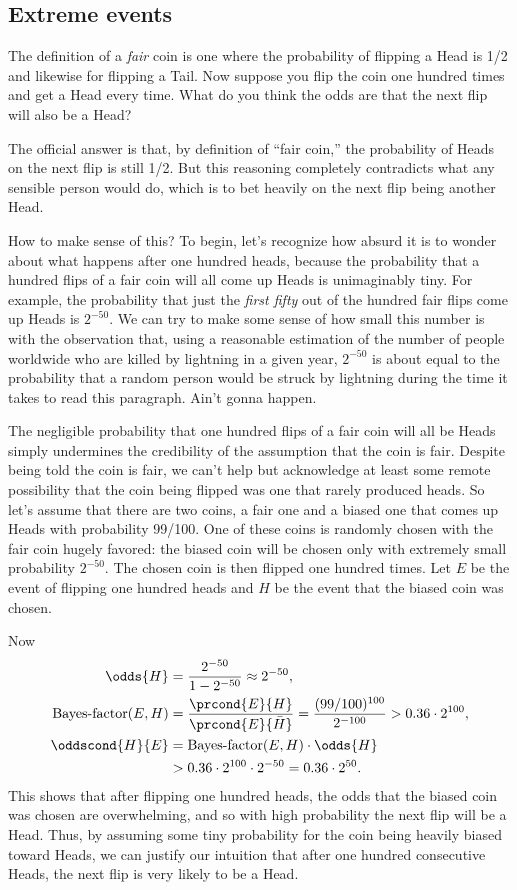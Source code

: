 \subsection{Extreme events}

The definition of a \emph{fair} coin is one where the probability of
flipping a Head is 1/2 and likewise for flipping a Tail.  Now suppose
you flip the coin one hundred times and get a Head every time.  What
do you think the odds are that the next flip will also be a Head?

The official answer is that, by definition of ``fair coin,'' the
probability of Heads on the next flip is still 1/2.  But this
reasoning completely contradicts what any sensible person would do,
which is to bet heavily on the next flip being another Head.

How to make sense of this?  To begin, let's recognize how absurd it is
to wonder about what happens after one hundred heads, because the
probability that a hundred flips of a fair coin will all come up Heads
is unimaginably tiny.  For example, the probability that just the
\emph{first fifty} out of the hundred fair flips come up Heads is
$2^{-50}$.  We can try to make some sense of how small this number is
with the observation that, using a reasonable estimation of the number
of people worldwide who are killed by lightning in a given year,
$2^{-50}$ is about equal to the probability that a random person would
be struck by lightning during the time it takes to read this
paragraph.  Ain't gonna happen.

The negligible probability that one hundred flips of a fair coin will
all be Heads simply undermines the credibility of the assumption that
the coin is fair.  Despite being told the coin is fair, we can't help
but acknowledge at least some remote possibility that the coin being
flipped was one that rarely produced heads.  So let's assume that
there are two coins, a fair one and a biased one that comes up Heads
with probability 99/100.  One of these coins is randomly chosen with
the fair coin hugely favored: the biased coin will be chosen only with
extremely small probability $2^{-50}$.  The chosen coin is then
flipped one hundred times.  Let $E$ be the event of flipping one
hundred heads and $H$ be the event that the biased coin was chosen.

Now
\begin{align*}
\odds{H} & = \frac{2^{-50}}{1-2^{-50}} \approx 2^{-50},\\
\BF{E}{H} & = \frac{\prcond{E}{H}}{\prcond{E}{\bar{H}}} = \frac{(99/100)^{100}}{2^{-100}} > 0.36 \cdot 2^{100},\\
\oddscond{H}{E} & = \BF{E}{H} \cdot \odds{H}\\
                & > 0.36 \cdot 2^{100} \cdot 2^{-50} = 0.36 \cdot 2^{50}.
\end{align*}
This shows that after flipping one hundred heads, the odds that the
biased coin was chosen are overwhelming, and so with high probability
the next flip will be a Head.  Thus, by assuming some tiny probability
for the coin being heavily biased toward Heads, we can justify our
intuition that after one hundred consecutive Heads, the next flip is
very likely to be a Head.

